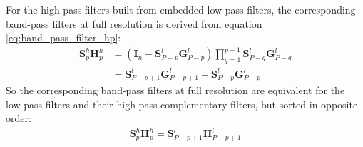 \documentclass[12pt]{scrartcl}
\begin{document}
For the high-pass filters built from embedded low-pass filters, the corresponding band-pass filters at full resolution is derived from equation \eqref{eq:band_pass_filter_hp}:
\begin{align}
\mathbf{S}^h_p \mathbf{H}^h_p & = \left(\mathbf{I}_n - \mathbf{S}^l_{P-p} \mathbf{G}^l_{P-p}\right) \prod_{q=1}^{p-1} \mathbf{S}^l_{P-q} \mathbf{G}^l_{P-q} \nonumber \\
& = \mathbf{S}^l_{P-p+1} \mathbf{G}^l_{P-p+1} - \mathbf{S}^l_{P-p} \mathbf{G}^l_{P-p}
\end{align}
So the corresponding band-pass filters at full resolution are equivalent for the low-pass filters and their high-pass complementary filters, but sorted in opposite order:
\begin{align}
\mathbf{S}^h_p \mathbf{H}^h_p = \mathbf{S}^l_{P-p+1} \mathbf{H}^l_{P-p+1}
\end{align}

\end{document}
